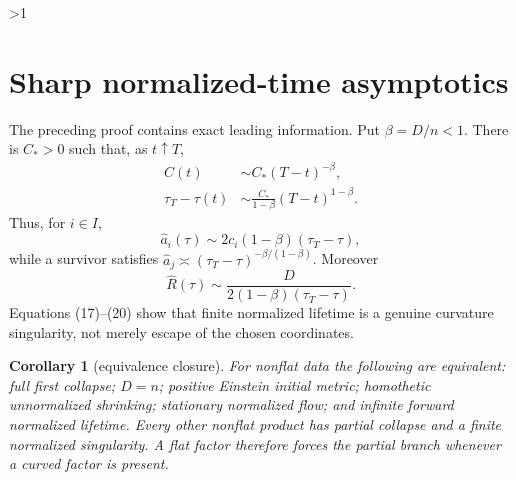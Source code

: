 \documentclass[10pt]{article}
\providecommand{\CRevisionRound}{2}
\newtheorem{corollary}{Corollary}
\begin{document}
\ifnum\CRevisionRound>1
\section{Sharp normalized-time asymptotics}
The preceding proof contains exact leading information.  Put
$\beta=D/n<1$.  There is $C_*>0$ such that, as $t\uparrow T$,
\begin{align}
 C(t)&\sim C_*(T-t)^{-\beta},                              \tag{17}\\
 \tau_T-\tau(t)&\sim\frac{C_*}{1-\beta}
                  (T-t)^{1-\beta}.                        \tag{18}
\end{align}
Thus, for $i\in I$,
\begin{equation}
 \widehat a_i(\tau)\sim
 2c_i(1-\beta)(\tau_T-\tau),                              \tag{19}
\end{equation}
while a survivor satisfies
$\widehat a_j\asymp(\tau_T-\tau)^{-\beta/(1-\beta)}$.
Moreover
\begin{equation}
 \widehat R(\tau)\sim
 \frac{D}{2(1-\beta)(\tau_T-\tau)}.                       \tag{20}
\end{equation}
Equations (17)--(20) show that finite normalized lifetime is a genuine
curvature singularity, not merely escape of the chosen coordinates.

\begin{corollary}[equivalence closure]
For nonflat data the following are equivalent: full first collapse; $D=n$;
positive Einstein initial metric; homothetic unnormalized shrinking;
stationary normalized flow; and infinite forward normalized lifetime.
Every other nonflat product has partial collapse and a finite normalized
singularity.  A flat factor therefore forces the partial branch whenever a
curved factor is present.
\end{corollary}
\end{document}
